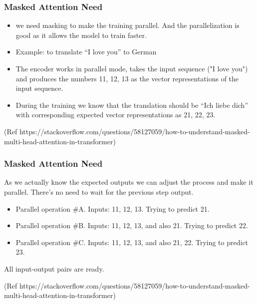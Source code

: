 \begin{frame}[fragile]\frametitle{Masked Attention Need}



\begin{itemize}
  \item  we need masking to make the training parallel. And the parallelization is good as it allows the model to train faster.
  \item  Example: to translate ``I love you'' to German
  \item The encoder works in parallel mode, takes the input sequence ("I love you")  and produces the numbers 11, 12, 13 as the vector representations of the input sequence.
  \item During the training we know that the translation should be ``Ich liebe dich'' with corresponding expected vector representations as 21, 22, 23.

\end{itemize}

{\tiny (Ref https://stackoverflow.com/questions/58127059/how-to-understand-masked-multi-head-attention-in-transformer)}

\end{frame}

\begin{frame}[fragile]\frametitle{Masked Attention Need}

As we actually know the expected outputs we can adjust the process and make it parallel. There's no need to wait for the previous step output.

\begin{itemize}
  \item  Parallel operation \#A. Inputs: 11, 12, 13. Trying to predict 21.
  \item Parallel operation \#B. Inputs: 11, 12, 13, and also 21. Trying to predict 22.
	\item Parallel operation \#C. Inputs: 11, 12, 13, and also 21, 22. Trying to predict 23.
\end{itemize}

All input-output pairs are ready.

{\tiny (Ref https://stackoverflow.com/questions/58127059/how-to-understand-masked-multi-head-attention-in-transformer)}

\end{frame}

